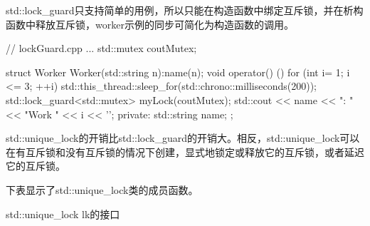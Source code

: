 
std::lock\_guard只支持简单的用例，所以只能在构造函数中绑定互斥锁，并在析构函数中释放互斥锁，worker示例的同步可简化为构造函数的调用。


\begin{cpp}
// lockGuard.cpp
...
std::mutex coutMutex;

struct Worker{
	Worker(std::string n):name(n){};
	void operator() (){
		for (int i= 1; i <= 3; ++i){
			std::this_thread::sleep_for(std::chrono::milliseconds(200));
			std::lock_guard<std::mutex> myLock(coutMutex);
			std::cout << name << ": " << "Work " << i << '\n';
		}
	}
	private:
	std::string name;
};
\end{cpp}


std::unique\_lock的开销比std::lock\_guard的开销大。相反，std::unique\_lock可以在有互斥锁和没有互斥锁的情况下创建，显式地锁定或释放它的互斥锁，或者延迟它的互斥锁。

下表显示了std::unique\_lock类的成员函数。

\begin{center}
std::unique\_lock lk的接口
\end{center}

